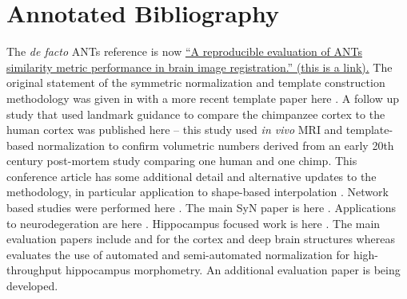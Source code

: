 \documentclass{InsightArticle}
\begin{document}
\section{Annotated Bibliography}
The {\em de facto} ANTs reference is now
\href{http://www.ncbi.nlm.nih.gov/pubmed/20851191}{``A reproducible
  evaluation of ANTs similarity metric performance in brain image
  registration.'' (this is a link).}  The original statement of the symmetric normalization and template
construction methodology was given in \cite{Avants2004} with a more 
recent template paper here \cite{Avants2009c}. 
A follow up study that used landmark guidance to compare the chimpanzee cortex to
the human cortex was published here \cite{Avants2006} -- this study
used {\em in vivo} MRI and template-based normalization to confirm
volumetric numbers derived from an early 20th century post-mortem
study comparing one human and one chimp.  This conference article has
some additional detail and alternative updates to the methodology, in
particular application to shape-based interpolation
\cite{Avants2005b}.  Network based studies were performed here
\cite{duda08miccai,duda08cvpr}.  The main SyN paper is here
\cite{Avants2008}.  Applications to neurodegeration are here
\cite{Avants2005,Avants2008a,Grossman2008,Avants2009,Das2009,Yushkevich2009,Massimo2009}.
Hippocampus focused work is here \cite{Pluta2009,Yushkevich2009}.  The
main evaluation papers include \cite{Avants2008} and \cite{Klein2009}
for the cortex and deep brain structures whereas \cite{Pluta2009}
evaluates the use of automated and semi-automated normalization for
high-throughput hippocampus morphometry.  An additional evaluation
paper is being developed.  


%
%



\end{document}
